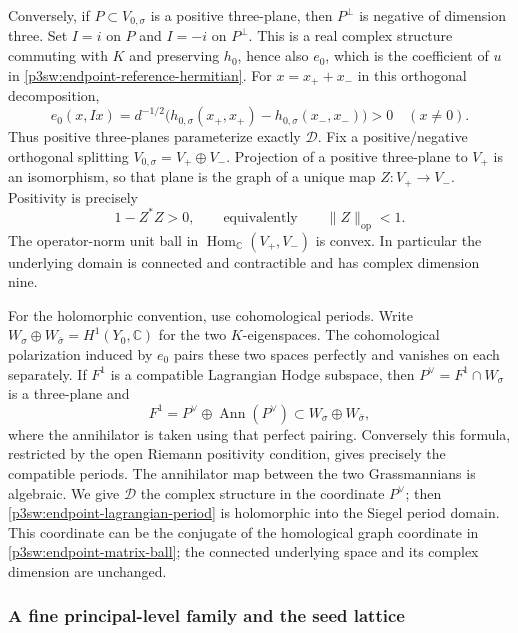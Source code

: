 \documentclass[11pt]{article}
\newcommand{\C}{\mathbb C}
\numberwithin{equation}{section}
\begin{document}
Conversely, if \(P\subset V_{0,\sigma}\) is a positive three-plane,
then \(P^\perp\) is negative of dimension three.  Set \(I=i\) on
\(P\) and \(I=-i\) on \(P^\perp\).  This is a real complex structure
commuting with \(K\) and preserving \(h_0\), hence also \(e_0\),
which is the coefficient of \(u\) in \eqref{p3sw:endpoint-reference-hermitian}.
For \(x=x_++x_-\) in this orthogonal decomposition,
\[
 e_0(x,Ix)
   =d^{-1/2}\bigl(h_{0,\sigma}(x_+,x_+)
                       -h_{0,\sigma}(x_-,x_-)\bigr)>0
 \quad(x\ne0).
\]
Thus positive three-planes parameterize exactly \(\mathscr D\).
Fix a positive/negative orthogonal splitting
\(V_{0,\sigma}=V_+\oplus V_-\).  Projection of a positive
three-plane to \(V_+\) is an isomorphism, so that plane is the graph
of a unique map \(Z:V_+\to V_-\).  Positivity is precisely
\begin{equation}
\label{p3sw:endpoint-matrix-ball}
 1-Z^*Z>0,\qquad\text{equivalently}\qquad \lVert Z\rVert_{\mathrm{op}}<1.
\end{equation}
The operator-norm unit ball in
\(\operatorname{Hom}_\C(V_+,V_-)\) is convex.  In particular the
underlying domain is connected and contractible and has complex
dimension nine.

For the holomorphic convention, use cohomological periods.  Write
\(W_\sigma\oplus W_{\bar\sigma}=H^1(Y_0,\C)\) for the two
\(K\)-eigenspaces.  The cohomological polarization induced by \(e_0\)
pairs these two spaces perfectly and vanishes on each separately.
If \(F^1\) is a compatible Lagrangian Hodge subspace, then
\(P^\vee=F^1\cap W_\sigma\) is a three-plane and
\begin{equation}
\label{p3sw:endpoint-lagrangian-period}
 F^1=P^\vee\oplus\operatorname{Ann}(P^\vee)
       \subset W_\sigma\oplus W_{\bar\sigma},
\end{equation}
where the annihilator is taken using that perfect pairing.
Conversely this formula, restricted by the open Riemann positivity
condition, gives precisely the compatible periods.  The annihilator
map between the two Grassmannians is algebraic.  We give
\(\mathscr D\) the complex structure in the coordinate \(P^\vee\);
then \eqref{p3sw:endpoint-lagrangian-period} is holomorphic into the
Siegel period domain.  This coordinate can be the conjugate of the
homological graph coordinate in \eqref{p3sw:endpoint-matrix-ball};
the connected underlying space and its complex dimension are unchanged.

\subsubsection{A fine principal-level family and the seed lattice}
\end{document}
